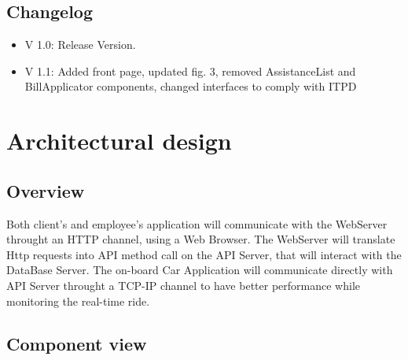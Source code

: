 \documentclass{article}
\begin{document}
\subsection{Changelog}
\begin{itemize}[noitemsep]
\item V 1.0: Release Version.
\item V 1.1: Added front page, updated fig. 3, removed AssistanceList and BillApplicator components, changed interfaces to comply with ITPD
\end{itemize}
\newpage
\section{Architectural design}
\subsection{Overview}
\begin{figure}[ht]
\end{figure}

Both client's and employee's application will communicate with the WebServer throught an HTTP channel, using a Web Browser.
The WebServer will translate Http requests into API method call on the API Server, that will interact with the DataBase Server.
The on-board Car Application will communicate directly with API Server throught a TCP-IP channel to have better performance
while monitoring the real-time ride.
\newpage
\subsection{Component view}
\end{document}
